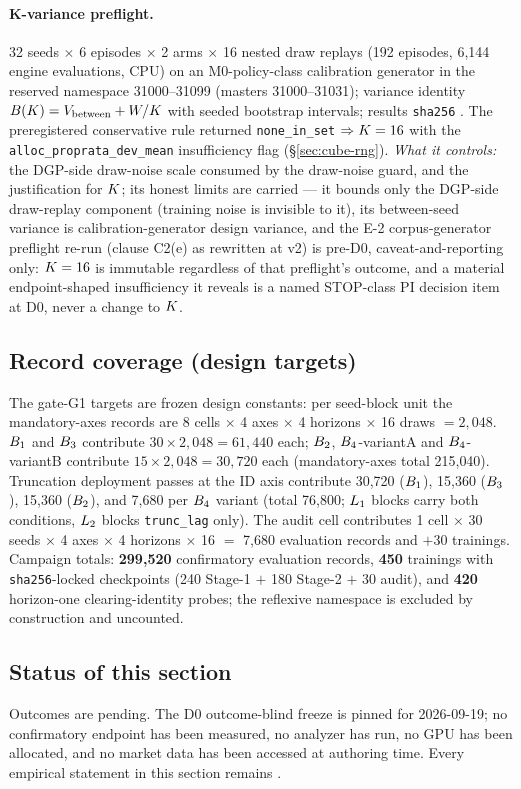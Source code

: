 \paragraph{K-variance preflight.}
32 seeds $\times$ 6 episodes $\times$ 2 arms $\times$ 16 nested draw replays
(192 episodes, 6{,}144 engine evaluations, CPU) on an M0-policy-class
calibration generator in the reserved namespace 31000--31099 (masters
31000--31031); variance identity $B(K) = V_{\mathrm{between}} +
W/K$ with seeded bootstrap intervals; results \texttt{sha256}
\kpreflighthash{}. The preregistered conservative rule returned
\texttt{none\_in\_set} $\Rightarrow K = 16$ with the
\texttt{alloc\_proprata\_dev\_mean} insufficiency flag
(\S\ref{sec:cube-rng}). \emph{What it controls:} the DGP-side draw-noise
scale consumed by the draw-noise guard, and the justification for $K$;
its honest limits are carried --- it bounds only the DGP-side draw-replay
component (training noise is invisible to it), its between-seed variance is
calibration-generator design variance, and the E-2 corpus-generator preflight
re-run (clause C2(e) as rewritten at v2) is pre-D0, caveat-and-reporting
only: $K = 16$ is immutable regardless of that preflight's outcome, and
a material endpoint-shaped insufficiency it reveals is a named STOP-class PI
decision item at D0, never a change to $K$.

\subsection{Record coverage (design targets)}
\label{sec:cube-coverage}

The gate-G1 targets are frozen design constants: per seed-block unit the
mandatory-axes records are 8 cells $\times$ 4 axes $\times$ 4 horizons
$\times$ 16 draws $= 2{,}048$. $B_{1}$ and $B_{3}$ contribute
$30 \times 2{,}048 = 61{,}440$ each; $B_{2}$, $B_{4}$-variantA and
$B_{4}$-variantB contribute $15 \times 2{,}048 = 30{,}720$ each
(mandatory-axes total 215{,}040). Truncation deployment passes at the ID
axis contribute 30{,}720 ($B_{1}$), 15{,}360 ($B_{3}$), 15{,}360 ($B_{2}$),
and 7{,}680 per $B_{4}$ variant (total 76{,}800; $L_{1}$ blocks carry both
conditions, $L_{2}$ blocks \texttt{trunc\_lag} only). The audit cell
contributes 1 cell $\times$ 30 seeds $\times$ 4 axes $\times$ 4 horizons
$\times$ 16 $=$ 7{,}680 evaluation records and $+30$ trainings. Campaign
totals: \textbf{299{,}520} confirmatory evaluation records, \textbf{450}
trainings with \texttt{sha256}-locked checkpoints (240 Stage-1 $+$ 180
Stage-2 $+$ 30 audit), and \textbf{420} horizon-one clearing-identity probes;
the reflexive namespace is excluded by construction and uncounted.

\subsection{Status of this section}

Outcomes are pending. The D0 outcome-blind freeze is pinned for 2026-09-19;
no confirmatory endpoint has been measured, no analyzer has run, no GPU has
been allocated, and no market data has been accessed at authoring time. Every
empirical statement in this section remains \RESULTSPENDING.
\endgroup
\endinput
